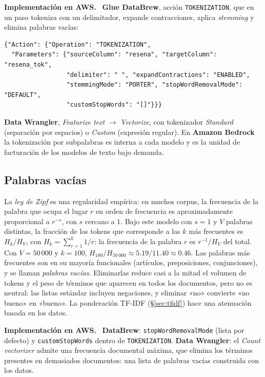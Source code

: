 \documentclass[11pt,a4paper]{article}
\theoremstyle{plain}
\theoremstyle{definition}
\theoremstyle{remark}
\newcommand{\1}{\mathbf{1}}
\newenvironment{aws}{\par\medskip\sloppy\noindent\textbf{Implementación en AWS.}\ }{\par\medskip}
\begin{document}
\begin{aws}
\textbf{Glue DataBrew}, acción \texttt{TOKENIZATION}, que en un paso
tokeniza con un delimitador, expande contracciones, aplica
\emph{stemming} y elimina palabras vacías:
\begin{lstlisting}
{"Action": {"Operation": "TOKENIZATION",
  "Parameters": {"sourceColumn": "resena", "targetColumn": "resena_tok",
                 "delimiter": " ", "expandContractions": "ENABLED",
                 "stemmingMode": "PORTER", "stopWordRemovalMode": "DEFAULT",
                 "customStopWords": "[]"}}}
\end{lstlisting}
\textbf{Data Wrangler}, \emph{Featurize text} $\to$ \emph{Vectorize}, con
tokenizador \emph{Standard} (separación por espacios) o \emph{Custom}
(expresión regular). En \textbf{Amazon Bedrock} la tokenización por
subpalabras es interna a cada modelo y es la unidad de facturación de los
modelos de texto bajo demanda.
\end{aws}

\subsection{Palabras vacías}

La \emph{ley de Zipf} es una regularidad empírica: en muchos corpus, la
frecuencia de la palabra que ocupa el lugar $r$ en orden de frecuencia es
aproximadamente proporcional a $r^{-s}$, con $s$ cercano a $1$. Bajo este
modelo con $s=1$ y $V$ palabras distintas, la fracción de los tokens que
corresponde a las $k$ más frecuentes es $H_k/H_V$, con
$H_k=\sum_{r=1}^k1/r$: la frecuencia de la palabra $r$ es $r^{-1}/H_V$ del
total. Con $V=50\,000$ y $k=100$, $H_{100}/H_{50\,000}\approx5.19/11.40\approx0.46$.
Las palabras más frecuentes son en su mayoría funcionales (artículos,
preposiciones, conjunciones), y se llaman \emph{palabras vacías}.
Eliminarlas reduce casi a la mitad el volumen de tokens y el peso de términos
que aparecen en todos los documentos, pero no es neutral: las listas
estándar incluyen negaciones, y eliminar «no» convierte «no bueno» en
«bueno». La ponderación TF-IDF (\S\ref{sec:tfidf}) hace una atenuación
basada en los datos.

\begin{aws}
\textbf{DataBrew}: \texttt{stopWordRemovalMode} (lista por defecto) y
\texttt{customStopWords} dentro de \texttt{TOKENIZATION}.
\textbf{Data Wrangler}: el \emph{Count vectorizer} admite una frecuencia
documental máxima, que elimina los términos presentes en demasiados
documentos: una lista de palabras vacías construida con los datos.
\end{aws}
\end{document}
